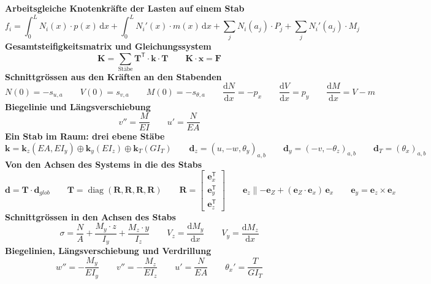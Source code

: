 \documentclass[11pt,a4paper]{article}
\begin{document}
\noindent\textbf{Arbeitsgleiche Knotenkräfte der Lasten auf einem Stab}
\begin{equation*}
f_i = \int_0^L N_i(x) \cdot p(x)\,\mathrm{d}x + \int_0^L N_i'(x) \cdot m(x)\,\mathrm{d}x + \sum_j N_i(a_j) \cdot P_j + \sum_j N_i'(a_j) \cdot M_j
\end{equation*}
\noindent\textbf{Gesamtsteifigkeitsmatrix und Gleichungssystem}
\begin{equation*}
\mathbf{K} = \sum_{\text{Stäbe}} \mathbf{T}^{\mathsf{T}} \cdot \mathbf{k} \cdot \mathbf{T} \qquad \mathbf{K} \cdot \mathbf{x} = \mathbf{F}
\end{equation*}
\noindent\textbf{Schnittgrössen aus den Kräften an den Stabenden}
\begin{equation*}
N(0) = -s_{u,a} \qquad V(0) = s_{v,a} \qquad M(0) = -s_{\theta,a} \qquad \frac{\mathrm{d}N}{\mathrm{d}x} = -p_x \qquad \frac{\mathrm{d}V}{\mathrm{d}x} = p_y \qquad \frac{\mathrm{d}M}{\mathrm{d}x} = V - m
\end{equation*}
\noindent\textbf{Biegelinie und Längsverschiebung}
\begin{equation*}
v'' = \frac{M}{EI} \qquad u' = \frac{N}{EA}
\end{equation*}
\noindent\textbf{Ein Stab im Raum: drei ebene Stäbe}
\begin{equation*}
\mathbf{k} = \mathbf{k}_{z}(EA, EI_y) \oplus \mathbf{k}_{y}(EI_z) \oplus \mathbf{k}_{T}(GI_T) \qquad \mathbf{d}_{z} = (u, -w, \theta_y)_{a,b} \qquad \mathbf{d}_{y} = (-v, -\theta_z)_{a,b} \qquad \mathbf{d}_{T} = (\theta_x)_{a,b}
\end{equation*}
\noindent\textbf{Von den Achsen des Systems in die des Stabs}
\begin{equation*}
\mathbf{d} = \mathbf{T} \cdot \mathbf{d}_{glob} \qquad \mathbf{T} = \operatorname{diag}(\mathbf{R}, \mathbf{R}, \mathbf{R}, \mathbf{R}) \qquad \mathbf{R} = \begin{bmatrix} \mathbf{e}_x^{\mathsf{T}} \\ \mathbf{e}_y^{\mathsf{T}} \\ \mathbf{e}_z^{\mathsf{T}} \end{bmatrix} \qquad \mathbf{e}_z \parallel -\mathbf{e}_Z + (\mathbf{e}_Z \cdot \mathbf{e}_x)\,\mathbf{e}_x \qquad \mathbf{e}_y = \mathbf{e}_z \times \mathbf{e}_x
\end{equation*}
\noindent\textbf{Schnittgrössen in den Achsen des Stabs}
\begin{equation*}
\sigma = \frac{N}{A} + \frac{M_y \cdot z}{I_y} + \frac{M_z \cdot y}{I_z} \qquad V_z = \frac{\mathrm{d}M_y}{\mathrm{d}x} \qquad V_y = \frac{\mathrm{d}M_z}{\mathrm{d}x}
\end{equation*}
\noindent\textbf{Biegelinien, Längsverschiebung und Verdrillung}
\begin{equation*}
w'' = -\frac{M_y}{EI_y} \qquad v'' = -\frac{M_z}{EI_z} \qquad u' = \frac{N}{EA} \qquad \theta_x' = \frac{T}{GI_T}
\end{equation*}
\end{document}
